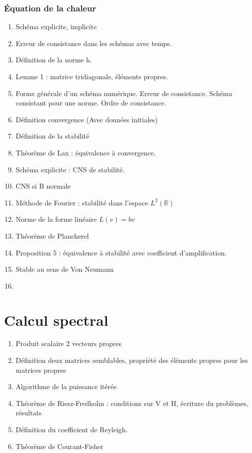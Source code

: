 \documentclass[11pt, twocolumn, landscape]{article}
\begin{document}
\section{Équation de la chaleur}
\begin{enumerate}
\item Schéma explicite, implicite
\item Erreur de consistance dans les schémas avec temps. 
\item Définition de la norme h. 
\item Lemme 1 : matrice tridiagonale, éléments propres. 
\item Forme générale d'un schéma numérique. Erreur de consistance. Schéma consistant pour une norme. Ordre de consistance.
\item Définition convergence (Avec données initiales)
\item Définition de la stabilité
\item Théorème de Lax : équivalence à convergence.
\item Schéma explicite : CNS de stabilité.
\item CNS si B normale
\item Méthode de Fourier : stabilité dans l'espace $L^2(\mathbb{R})$
\item Norme de la forme linéaire $L(v)=bv$
\item Théorème de Plancherel
\item Proposition 5 : équivalence à stabilité avec coefficient d'amplification.
\item Stable au sens de Von Neumann
\item 
\end{enumerate}

\part{Calcul spectral}
\begin{enumerate}
\item Produit scalaire 2 vecteurs propres
\item Définition deux matrices semblables, propriété des éléments propres pour les matrices propres
\item Algorithme de la puissance itérée
\item Théorème de Riesz-Fredholm : conditions sur V et H, écriture du problèmes, résultats
\item Définition du coefficient de Reyleigh.
\item Théorème de Courant-Fisher
\end{enumerate}
\end{document}
